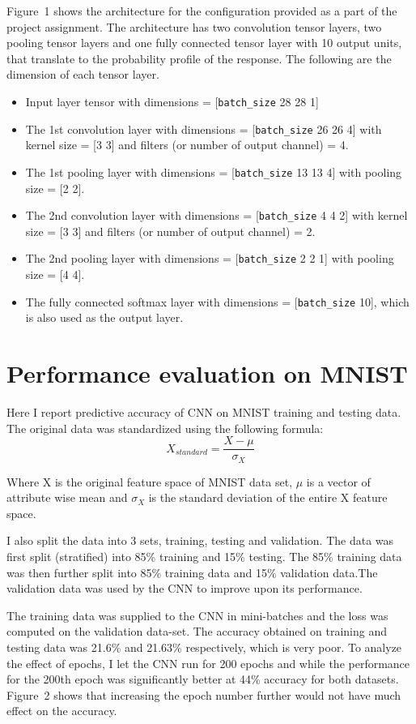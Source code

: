 \documentclass[12pt]{article}
\begin{document}
Figure~1 shows the architecture for the configuration provided as a part of the project assignment. The architecture has two convolution tensor layers, two pooling tensor layers and one fully connected tensor layer with 10 output units, that translate to the probability profile of the response. The following are the dimension of each tensor layer.

\begin{itemize}
\item Input layer tensor with dimensions = [\texttt{batch\_size} 28 28 1] 
\item The 1st convolution layer with dimensions = [\texttt{batch\_size} 26 26 4] with kernel size = [3 3] and filters (or number of output channel) = 4.
\item The 1st pooling layer with dimensions = [\texttt{batch\_size} 13 13 4] with pooling size = [2 2].
\item The 2nd convolution layer with dimensions = [\texttt{batch\_size} 4 4 2] with kernel size = [3 3] and filters (or number of output channel) = 2.
\item The 2nd pooling layer with dimensions = [\texttt{batch\_size} 2 2 1] with pooling size = [4 4].
\item The fully connected softmax layer with dimensions = [\texttt{batch\_size} 10], which is also used as the output layer.
\end{itemize}
\section*{Performance evaluation on MNIST}

Here I report predictive accuracy of CNN on MNIST training and testing data. The original data was standardized using the following formula:
\begin{equation}
X_{standard} = \frac{X - \mu}{\sigma_X} 
\end{equation}

Where X is the original feature space of MNIST data set, $\mu$ is a vector of attribute wise mean and $\sigma_X$ is the standard deviation of the entire X feature space.

I also split the data into 3 sets, training, testing and validation. The data was first split (stratified) into 85\% training and 15\% testing. The 85\% training data was then further split into 85\% training data and 15\% validation data.The validation data was used by the CNN to improve upon its performance.

The training data was supplied to the CNN in mini-batches and the loss was computed on the validation data-set. The accuracy obtained on training and testing data was 21.6\% and 21.63\% respectively, which is very poor. To analyze the effect of epochs, I let the CNN run for 200 epochs and while the performance for the 200th epoch was significantly better at 44\% accuracy for both datasets. Figure~2 shows that increasing the epoch number further would not have much effect on the accuracy.
\end{document}
